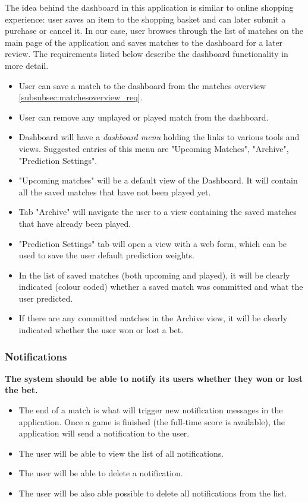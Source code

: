 The idea behind the dashboard in this application is similar to online shopping experience: user saves an item to the shopping basket and can later submit a purchase or cancel it. In our case, user browses through the list of matches on the main page of the application and saves matches to the dashboard for a later review. The requirements listed below describe the dashboard functionality in more detail.

\begin{itemize}
   \item User can save a match to the dashboard from the matches overview  \ref{subsubsec:matchesoverview_req}.
   \item User can remove any unplayed or played match from the dashboard.
   \item Dashboard will have a \emph{dashboard menu} holding the links to various tools and views. Suggested entries of this menu are "Upcoming Matches", "Archive", "Prediction Settings".
   \item "Upcoming matches" will be a default view of the Dashboard. It will contain all the saved matches that have not been played yet.
   \item Tab "Archive" will navigate the user to a view containing the saved matches that have already been played.
   \item "Prediction Settings" tab will open a view with a web form, which can be used to save the user default prediction weights.
   \item In the list of saved matches (both upcoming and played), it will be clearly indicated (colour coded) whether a saved match was committed and what the user predicted.
   \item If there are any committed matches in the Archive view, it will be clearly indicated whether the user won or lost a bet.
\end{itemize}

\subsubsection{Notifications}
\label{subsubsec:notifications_req}
\textbf{The system should be able to notify its users whether they won or lost the bet.}
\begin{itemize}
   \item The end of a match is what will trigger new notification messages in the application. Once a game is finished (the full-time score is available), the application will send a notification to the user.
   \item The user will be able to view the list of all notifications.
   \item The user will be able to delete a notification.
   \item The user will be also able possible to delete all notifications from the list.
\end{itemize}

